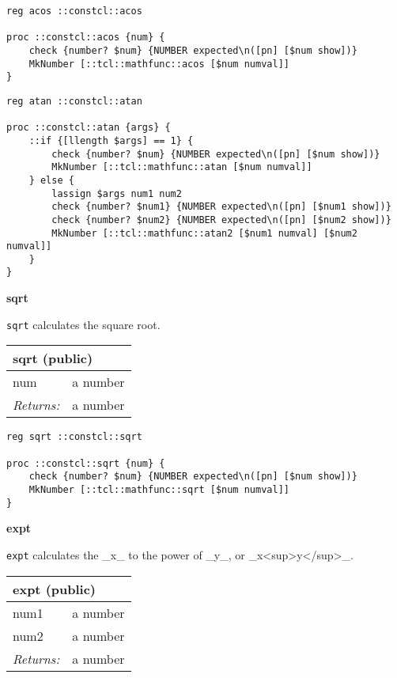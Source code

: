 \documentclass{report}
\begin{document}
\noindent\makebox[\linewidth]{\rule{\linewidth}{0.4pt}}
\noindent\makebox[\linewidth]{\rule{\linewidth}{0.4pt}}
\begin{lstlisting}
reg acos ::constcl::acos
 
proc ::constcl::acos {num} {
    check {number? $num} {NUMBER expected\n([pn] [$num show])}
    MkNumber [::tcl::mathfunc::acos [$num numval]]
}
\end{lstlisting}
\noindent\makebox[\linewidth]{\rule{\linewidth}{0.4pt}}
\noindent\makebox[\linewidth]{\rule{\linewidth}{0.4pt}}
\begin{lstlisting}
reg atan ::constcl::atan
 
proc ::constcl::atan {args} {
    ::if {[llength $args] == 1} {
        check {number? $num} {NUMBER expected\n([pn] [$num show])}
        MkNumber [::tcl::mathfunc::atan [$num numval]]
    } else {
        lassign $args num1 num2
        check {number? $num1} {NUMBER expected\n([pn] [$num1 show])}
        check {number? $num2} {NUMBER expected\n([pn] [$num2 show])}
        MkNumber [::tcl::mathfunc::atan2 [$num1 numval] [$num2 numval]]
    }
}
\end{lstlisting}
\noindent\makebox[\linewidth]{\rule{\linewidth}{0.4pt}}

\textbf{sqrt}


\texttt{sqrt} calculates the square root.

\begin{tabular}{ |l l| }
\hline
\multicolumn{2}{|l|}{sqrt (public)} \\
\hline
num & a number \\
\textit{Returns:} & a number \\
\hline
\end{tabular}

\noindent\makebox[\linewidth]{\rule{\linewidth}{0.4pt}}
\begin{lstlisting}
reg sqrt ::constcl::sqrt
 
proc ::constcl::sqrt {num} {
    check {number? $num} {NUMBER expected\n([pn] [$num show])}
    MkNumber [::tcl::mathfunc::sqrt [$num numval]]
}
\end{lstlisting}
\noindent\makebox[\linewidth]{\rule{\linewidth}{0.4pt}}

\textbf{expt}


\texttt{expt} calculates the \_x\_ to the power of \_y\_, or \_x<sup>y</sup>\_.

\begin{tabular}{ |l l| }
\hline
\multicolumn{2}{|l|}{expt (public)} \\
\hline
num1 & a number \\
num2 & a number \\
\textit{Returns:} & a number \\
\hline
\end{tabular}
\end{document}
